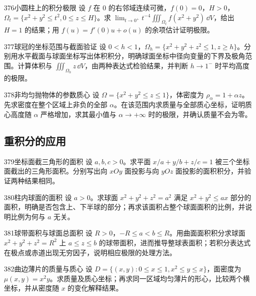 \begin{exercise}{376}{小圆柱上的积分极限}
设 $f$ 在 $0$ 的右邻域连续可微，$f(0)=0$，$H>0$，$\Omega_t=\{x^2+y^2\leq t^2,0\leq z\leq H\}$。求
$\lim_{t\to0^+}t^{-4}\iiint_{\Omega_t}f(x^2+y^2)\,\dd V$，给出 $H=1$ 的结果；用 $f(u)=f'(0)u+o(u)$ 的余项估计证明极限。
\end{exercise}

\begin{exercise}{377}{球冠的坐标范围与截面验证}
设 $0<h<1$，$\Omega_h=\{x^2+y^2+z^2\leq1,z\geq h\}$。分别用水平截面与球面坐标写出体积积分，明确球面坐标中径向变量的下界及极角范围。计算体积与 $\iiint_{\Omega_h}z\,\dd V$，由两种表达式检验结果，并判断 $h\to1^-$ 时平均高度的极限。
\end{exercise}

\begin{exercise}{378}{非均匀抛物体的参数质心}
设 $\Omega=\{x^2+y^2\leq z\leq1\}$，体密度为 $\rho_\alpha=1+\alpha z$。
先求密度在整个区域上非负的全部 $\alpha$。在该范围内求质量与全部质心坐标，证明质心高度随 $\alpha$ 严格增加，求其最小值与 $\alpha\to+\infty$ 时的极限，并确认质量不会为零。
\end{exercise}

\subsection{重积分的应用}

\begin{exercise}{379}{坐标面截三角形的面积}
设 $a,b,c>0$。求平面 $x/a+y/b+z/c=1$ 被三个坐标面截出的三角形面积。分别写出向 $xOy$ 面投影与向 $yOz$ 面投影的面积积分，并验证两种结果相同。
\end{exercise}

\begin{exercise}{380}{柱内球面的面积}
设 $a>0$。求球面 $x^2+y^2+z^2=a^2$ 满足 $x^2+y^2\leq ax$ 部分的面积，明确是否包含上、下半球的部分；再求该面积占整个球面面积的比例，并说明比例为何与 $a$ 无关。
\end{exercise}

\begin{exercise}{381}{球带面积与球面总面积}
设 $R>0$，$-R\leq a<b\leq R$。用曲面面积积分求球面 $x^2+y^2+z^2=R^2$ 上 $a\leq z\leq b$ 的球带面积，进而推导整球表面积；若积分表达式在极点或赤道出现无穷因子，说明相应极限的处理方法。
\end{exercise}

\begin{exercise}{382}{曲边薄片的质量与质心}
设 $D=\{(x,y):0\leq x\leq1,x^2\leq y\leq x\}$，面密度为 $\mu(x,y)=x^2y$。求质量及质心坐标；再求同一区域均匀薄片的形心，比较两个横坐标，并从密度随 $x$ 的变化解释结果。
\end{exercise}

